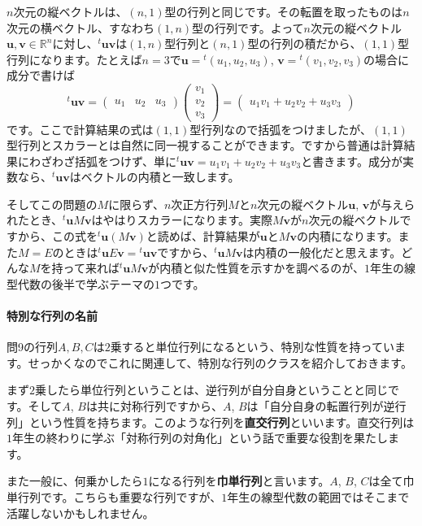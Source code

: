$n$次元の縦ベクトルは、$(n,1)$型の行列と同じです。その転置を取ったものは$n$次元の横ベクトル、すなわち$(1,n)$型の行列です。よって$n$次元の縦ベクトル$\bm{u},\bm{v}\in\mathbb{R}^n$に対し、${}^t\bm{u}\bm{v}$は$(1,n)$型行列と$(n,1)$型の行列の積だから、$(1,1)$型行列になります。たとえば$n=3$で$\bm{u} = {}^t(u_1, u_2, u_3)$, $\bm{v} = {}^t(v_1, v_2, v_3)$の場合に成分で書けば
\[
{}^t \bm{u}\bm{v}
=
\begin{pmatrix}
u_1 & u_2 & u_3
\end{pmatrix}
\begin{pmatrix}
v_1 \\
v_2 \\
v_3
\end{pmatrix}
=
\begin{pmatrix}
u_1 v_1 + u_2 v_2 + u_3 v_3
\end{pmatrix}
\]
です。ここで計算結果の式は$(1, 1)$型行列なので括弧をつけましたが、$(1, 1)$型行列とスカラーとは自然に同一視することができます。ですから普通は計算結果にわざわざ括弧をつけず、単に${}^t\bm{u}\bm{v} = u_1 v_1 + u_2 v_2 + u_3 v_3$と書きます。成分が実数なら、${}^t\bm{u}\bm{v}$はベクトルの内積と一致します。

そしてこの問題の$M$に限らず、$n$次正方行列$M$と$n$次元の縦ベクトル$\bm{u}$, $\bm{v}$が与えられたとき、${}^t\bm{u}M\bm{v}$はやはりスカラーになります。実際$M\bm{v}$が$n$次元の縦ベクトルですから、この式を${}^t\bm{u}(M\bm{v})$と読めば、計算結果が$\bm{u}$と$M\bm{v}$の内積になります。また$M=E$のときは${}^t\bm{u}E\bm{v}={}^t\bm{u}\bm{v}$ですから、${}^t\bm{u}M\bm{v}$は内積の一般化だと思えます。どんな$M$を持って来れば${}^t\bm{u}M\bm{v}$が内積と似た性質を示すかを調べるのが、$1$年生の線型代数の後半で学ぶテーマの$1$つです。

\paragraph{特別な行列の名前}

問9の行列$A, B, C$は$2$乗すると単位行列になるという、特別な性質を持っています。せっかくなのでこれに関連して、特別な行列のクラスを紹介しておきます。

まず$2$乗したら単位行列ということは、逆行列が自分自身ということと同じです。そして$A$, $B$は共に対称行列ですから、$A$, $B$は「自分自身の転置行列が逆行列」という性質を持ちます。このような行列を\textbf{直交行列}といいます。直交行列は$1$年生の終わりに学ぶ「対称行列の対角化」という話で重要な役割を果たします。

また一般に、何乗かしたら$1$になる行列を\textbf{巾単行列}と言います。$A$, $B$, $C$は全て巾単行列です。こちらも重要な行列ですが、$1$年生の線型代数の範囲ではそこまで活躍しないかもしれません。

